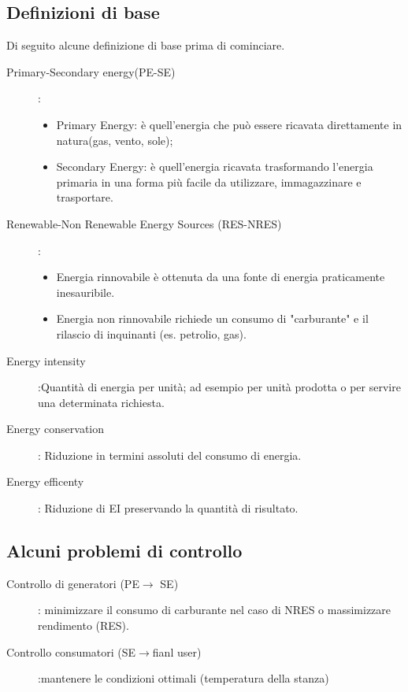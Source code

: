 \subsection{Definizioni di base}
Di seguito alcune definizione di base prima di cominciare.
\begin{description}
\item[Primary-Secondary energy(PE-SE)]:
\begin{itemize}
\item Primary Energy: è quell'energia che può essere ricavata direttamente in natura(gas, vento, sole);
\item Secondary Energy: è quell'energia ricavata trasformando l'energia primaria in una forma più facile da utilizzare, immagazzinare e trasportare.
\end{itemize}
\item[Renewable-Non Renewable Energy Sources (RES-NRES)]:
\begin{itemize}
\item Energia rinnovabile è ottenuta da una fonte di energia praticamente inesauribile.
\item Energia non rinnovabile richiede un consumo di "carburante" e il rilascio di inquinanti (es. petrolio, gas).
\end{itemize}
\item[Energy intensity]:Quantità di energia per unità; ad esempio per unità prodotta o per servire una determinata richiesta.
\item[Energy conservation]: Riduzione in termini assoluti del consumo di energia.
\item[Energy efficenty]: Riduzione di EI preservando la quantità di risultato.
\end{description}

\subsection{Alcuni problemi di controllo}
\begin{description}
\item[Controllo di generatori (PE$\rightarrow$ SE)]: minimizzare il consumo di carburante nel caso di NRES o massimizzare rendimento (RES).
\item[Controllo consumatori (SE$\rightarrow$fianl user)]:mantenere le condizioni ottimali (temperatura della stanza)
\end{description}
